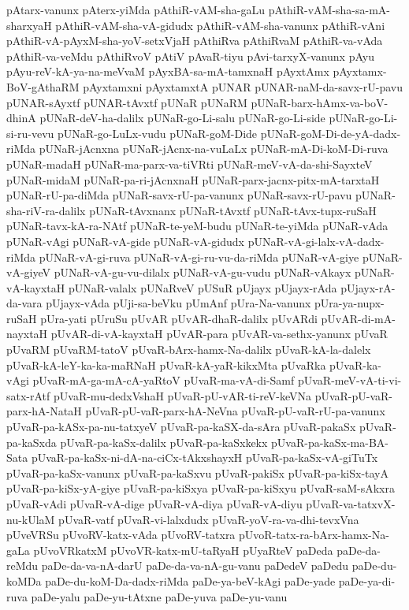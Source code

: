 {pAtarx-vanunx
pAterx-yiMda
pAthiR-vAM-sha-gaLu
pAthiR-vAM-sha-sa-mA-sharxyaH
pAthiR-vAM-sha-vA-gidudx
pAthiR-vAM-sha-vanunx
pAthiR-vAni
pAthiR-vA-pAyxM-sha-yoV-setxVjaH
pAthiRva
pAthiRvaM
pAthiR-va-vAda
pAthiR-va-veMdu
pAthiRvoV
pAtiV
pAvaR-tiyu
pAvi-tarxyX-vanunx
pAyu
pAyu-reV-kA-ya-na-meVvaM
pAyxBA-sa-mA-tamxnaH
pAyxtAmx
pAyxtamx-BoV-gAthaRM
pAyxtamxni
pAyxtamxtA
pUNAR
pUNAR-naM-da-savx-rU-pavu
pUNAR-sAyxtf
pUNAR-tAvxtf
pUNaR
pUNaRM
pUNaR-barx-hAmx-va-boV-dhinA
pUNaR-deV-ha-dalilx
pUNaR-go-Li-salu
pUNaR-go-Li-side
pUNaR-go-Li-si-ru-vevu
pUNaR-go-LuLx-vudu
pUNaR-goM-Dide
pUNaR-goM-Di-de-yA-dadx-riMda
pUNaR-jAcnxna
pUNaR-jAcnx-na-vuLaLx
pUNaR-mA-Di-koM-Di-ruva
pUNaR-madaH
pUNaR-ma-parx-va-tiVRti
pUNaR-meV-vA-da-shi-SayxteV
pUNaR-midaM
pUNaR-pa-ri-jAcnxnaH
pUNaR-parx-jacnx-pitx-mA-tarxtaH
pUNaR-rU-pa-diMda
pUNaR-savx-rU-pa-vanunx
pUNaR-savx-rU-pavu
pUNaR-sha-riV-ra-dalilx
pUNaR-tAvxnanx
pUNaR-tAvxtf
pUNaR-tAvx-tupx-ruSaH
pUNaR-tavx-kA-ra-NAtf
pUNaR-te-yeM-budu
pUNaR-te-yiMda
pUNaR-vAda
pUNaR-vAgi
pUNaR-vA-gide
pUNaR-vA-gidudx
pUNaR-vA-gi-lalx-vA-dadx-riMda
pUNaR-vA-gi-ruva
pUNaR-vA-gi-ru-vu-da-riMda
pUNaR-vA-giye
pUNaR-vA-giyeV
pUNaR-vA-gu-vu-dilalx
pUNaR-vA-gu-vudu
pUNaR-vAkayx
pUNaR-vA-kayxtaH
pUNaR-valalx
pUNaRveV
pUSuR
pUjayx
pUjayx-rAda
pUjayx-rA-da-vara
pUjayx-vAda
pUji-sa-beVku
pUmAnf
pUra-Na-vanunx
pUra-ya-nupx-ruSaH
pUra-yati
pUruSu
pUvAR
pUvAR-dhaR-dalilx
pUvARdi
pUvAR-di-mA-nayxtaH
pUvAR-di-vA-kayxtaH
pUvAR-para
pUvAR-va-sethx-yanunx
pUvaR
pUvaRM
pUvaRM-tatoV
pUvaR-bArx-hamx-Na-dalilx
pUvaR-kA-la-dalelx
pUvaR-kA-leY-ka-ka-maRNaH
pUvaR-kA-yaR-kikxMta
pUvaRka
pUvaR-ka-vAgi
pUvaR-mA-ga-mA-cA-yaRtoV
pUvaR-ma-vA-di-Samf
pUvaR-meV-vA-ti-vi-satx-rAtf
pUvaR-mu-dedxVshaH
pUvaR-pU-vAR-ti-reV-keVNa
pUvaR-pU-vaR-parx-hA-NataH
pUvaR-pU-vaR-parx-hA-NeVna
pUvaR-pU-vaR-rU-pa-vanunx
pUvaR-pa-kASx-pa-nu-tatxyeV
pUvaR-pa-kaSX-da-sAra
pUvaR-pakaSx
pUvaR-pa-kaSxda
pUvaR-pa-kaSx-dalilx
pUvaR-pa-kaSxkekx
pUvaR-pa-kaSx-ma-BA-Sata
pUvaR-pa-kaSx-ni-dA-na-ciCx-tAkxshayxH
pUvaR-pa-kaSx-vA-giTuTx
pUvaR-pa-kaSx-vanunx
pUvaR-pa-kaSxvu
pUvaR-pakiSx
pUvaR-pa-kiSx-tayA
pUvaR-pa-kiSx-yA-giye
pUvaR-pa-kiSxya
pUvaR-pa-kiSxyu
pUvaR-saM-sAkxra
pUvaR-vAdi
pUvaR-vA-dige
pUvaR-vA-diya
pUvaR-vA-diyu
pUvaR-va-tatxvX-nu-kUlaM
pUvaR-vatf
pUvaR-vi-lalxdudx
pUvaR-yoV-ra-va-dhi-tevxVna
pUveVRSu
pUvoRV-katx-vAda
pUvoRV-tatxra
pUvoR-tatx-ra-bArx-hamx-Na-gaLa
pUvoVRkatxM
pUvoVR-katx-mU-taRyaH
pUyaRteV
paDeda
paDe-da-reMdu
paDe-da-va-nA-darU
paDe-da-va-nA-gu-vanu
paDedeV
paDedu
paDe-du-koMDa
paDe-du-koM-Da-dadx-riMda
paDe-ya-beV-kAgi
paDe-yade
paDe-ya-di-ruva
paDe-yalu
paDe-yu-tAtxne
paDe-yuva
paDe-yu-vanu
}
